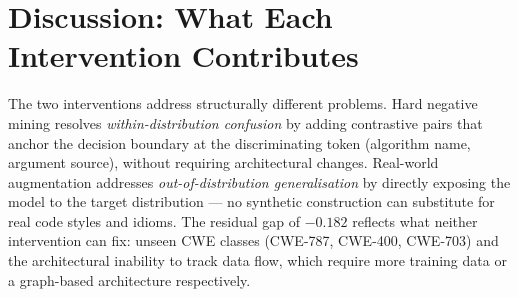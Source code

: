 \section{Discussion: What Each Intervention Contributes}

The two interventions address structurally different problems.
Hard negative mining resolves \emph{within-distribution confusion} by adding contrastive
pairs that anchor the decision boundary at the discriminating token (algorithm name,
argument source), without requiring architectural changes.
Real-world augmentation addresses \emph{out-of-distribution generalisation} by directly
exposing the model to the target distribution --- no synthetic construction can substitute
for real code styles and idioms.
The residual gap of $-0.182$ reflects what neither intervention can fix: unseen CWE classes
(CWE-787, CWE-400, CWE-703) and the architectural inability to track data flow, which
require more training data or a graph-based architecture respectively.

